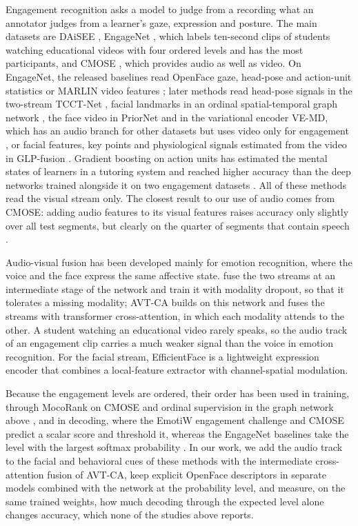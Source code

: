 \documentclass[pdflatex,iicol,sn-basic]{sn-jnl}
\begin{document}
Engagement recognition asks a model to judge from a recording what an annotator judges from a learner's gaze, expression and posture. The main datasets are DAiSEE \citep{gupta2016daisee}, EngageNet \citep{singh2023engagenet}, which labels ten-second clips of students watching educational videos with four ordered levels and has the most participants, and CMOSE \citep{wu2024cmose}, which provides audio as well as video. On EngageNet, the released baselines read OpenFace gaze, head-pose and action-unit statistics or MARLIN video features \citep{singh2023engagenet}; later methods read head-pose signals in the two-stream TCCT-Net \citep{vedernikov2024tcct}, facial landmarks in an ordinal spatial-temporal graph network \citep{abedi2024stgcn}, the face video in PriorNet \citep{vedernikov2026priornet} and in the variational encoder VE-MD, which has an audio branch for other datasets but uses video only for engagement \citep{augusma2026vemd}, or facial features, key points and physiological signals estimated from the video in GLP-fusion \citep{qin2026glpfusion}. Gradient boosting on action units has estimated the mental states of learners in a tutoring system \citep{wang2026shap} and reached higher accuracy than the deep networks trained alongside it on two engagement datasets \citep{das2025optimizing}. All of these methods read the visual stream only. The closest result to our use of audio comes from CMOSE: adding audio features to its visual features raises accuracy only slightly over all test segments, but clearly on the quarter of segments that contain speech \citep{wu2024cmose}.

Audio-visual fusion has been developed mainly for emotion recognition, where the voice and the face express the same affective state. \citet{chumachenko2022selfattention} fuse the two streams at an intermediate stage of the network and train it with modality dropout, so that it tolerates a missing modality; AVT-CA \citep{venkatraman2025avtca} builds on this network and fuses the streams with transformer cross-attention, in which each modality attends to the other. A student watching an educational video rarely speaks, so the audio track of an engagement clip carries a much weaker signal than the voice in emotion recognition. For the facial stream, EfficientFace \citep{zhao2021efficientface} is a lightweight expression encoder that combines a local-feature extractor with channel-spatial modulation.

Because the engagement levels are ordered, their order has been used in training, through MocoRank on CMOSE \citep{wu2024cmose} and ordinal supervision in the graph network above \citep{abedi2024stgcn}, and in decoding, where the EmotiW engagement challenge \citep{dhall2020emotiw} and CMOSE predict a scalar score and threshold it, whereas the EngageNet baselines take the level with the largest softmax probability \citep{singh2023engagenet}. In our work, we add the audio track to the facial and behavioral cues of these methods with the intermediate cross-attention fusion of AVT-CA, keep explicit OpenFace descriptors in separate models combined with the network at the probability level, and measure, on the same trained weights, how much decoding through the expected level alone changes accuracy, which none of the studies above reports.
\end{document}
